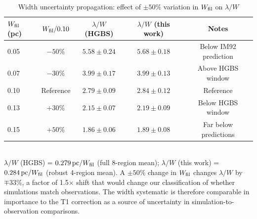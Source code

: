 \documentclass[twoside,twocolumn]{mnras}
\begin{document}
\begin{table}[h]
\caption{Width uncertainty propagation: effect of $\pm 50\%$ variation in $W_{\rm fil}$ on $\lambda/W$}
\label{tab:width_budget}
\small
\begin{tabular}{lcccc}
\toprule
$W_{\rm fil}$ (pc) & $W_{\rm fil}/0.10$ & $\lambda/W$ (HGBS) & $\lambda/W$ (this work) & Notes \\
\midrule
0.05  & $-50\%$ & $5.58 \pm 0.24$ & $5.68 \pm 0.18$ & Below IM92 prediction \\
0.07  & $-30\%$ & $3.99 \pm 0.17$ & $3.99 \pm 0.13$ & Above HGBS window \\
0.10  & Reference & $2.79 \pm 0.09$ & $2.84 \pm 0.12$ & Reference \\
0.13  & $+30\%$ & $2.15 \pm 0.07$ & $2.19 \pm 0.09$ & Below HGBS window \\
0.15  & $+50\%$ & $1.86 \pm 0.06$ & $1.89 \pm 0.08$ & Far below predictions \\
\bottomrule
\end{tabular}
\\[2pt]
\footnotesize $\lambda/W$ (HGBS) = $0.279\,{\rm pc}/W_{\rm fil}$ (full 8-region mean); $\lambda/W$ (this work) = $0.284\,{\rm pc}/W_{\rm fil}$ (robust 4-region mean). A $\pm 50\%$ change in $W_{\rm fil}$ changes $\lambda/W$ by $\mp 33\%$, a factor of 1.5$\times$ shift that would change our classification of whether simulations match observations. The width systematic is therefore comparable in importance to the T1 correction as a source of uncertainty in simulation-to-observation comparisons.
\end{table}
\end{document}
